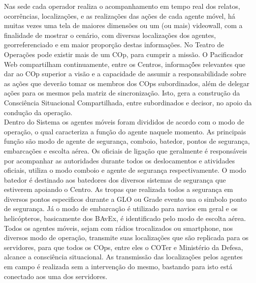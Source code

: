 \hspace{1.5cm}
Nas sede cada operador realiza o acompanhamento em tempo real dos relatos, ocorrências, localizações, e as realizações das ações de cada agente móvel, há muitas vezes uma tela de maiores dimensões ou um (ou mais) videowall, com a finalidade de mostrar o cenário, com diversas localizações dos agentes, georreferenciado e em maior proporção destas informações. No Teatro de Operações pode existir mais de um COp, para cumprir a missão. O Pacificador Web compartilham continuamente, entre os Centros, informaçṍes relevantes que dar ao COp superior a visão e a capacidade de assumir a responsabilidade sobre as ações que deverão tomar os membros dos COps subordinados, além de delegar ações para os mesmos pela matriz de sincronização. Isto, gera a construção da Consciência Situacional Compartilhada, entre subordinados e decisor, no apoio da condução da operação.\\

Dentro do Sistema os agentes móveis foram divididos de acordo com o modo de operação, o qual caracteriza a função do agente naquele momento. As principais função são modo de agente de segurança, comboio, batedor, pontos de segurança, embarcações e escolta aérea. Os oficiais de ligação que geralmente é responsáveis por acompanhar as autoridades durante todos os deslocamentos e atividades oficiais, utiliza o modo comboio e agente de segurança respectivamente. O modo batedor é destinado aos batedores dos diversos sistemas de segurança que estiverem apoiando o Centro. As tropas que realizada todos a segurança em diversos pontos especificos durante a GLO ou Grade evento usa o simbolo ponto de segurança. Já o modo de embarcação é utilizado para navios em geral e os helicópteros, basicamente dos BAvEx, é identificado pelo modo de escolta aérea. Todos os agentes móveis, sejam com rádios trocalizados ou smartphone, nos diversos modo de operação, transmite suas localizações que são replicada para os servidores, para que todos os COps, entre eles o COTer e Ministério da Defesa, alcance a consciência situacional. As transmissão das localizações pelos agentes em campo é realizada sem a intervenção do mesmo, bastando para isto está conectado aos uma dos servidores.

